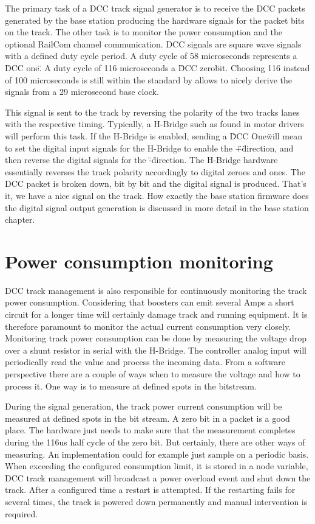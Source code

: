 The primary task of a DCC track signal generator is to receive the DCC packets generated by the base station producing the hardware signals for the packet bits on the track. The other task is to monitor the power consumption and the optional RailCom channel communication. DCC signals are square wave signals with a defined duty cycle period. A duty cycle of 58 microseconds represents a \"DCC one\". A duty cycle of 116 microseconds a \"DCC zero\" bit. Choosing 116 instead of 100 microseconds is still within the standard by allows to nicely derive the signals from a 29 microsecond base clock. 

This signal is sent to the track by reversing the polarity of the two tracks lanes with the respective timing. Typically, a H-Bridge such as found in motor drivers will perform this task. If the H-Bridge is enabled, sending a \"DCC One\" will mean to set the digital input signals for the H-Bridge to enable the \"+\" direction, and then reverse the digital signals for the \"-\" direction. The H-Bridge hardware essentially reverses the track polarity accordingly to digital zeroes and ones. The DCC packet is broken down, bit by bit and the digital signal is produced.  That's it, we have a nice signal on the track. How exactly the base station firmware does the digital signal output generation is discussed in more detail in the base station chapter.

\section{Power consumption monitoring}

DCC track management is also responsible for continuously monitoring the track power consumption. Considering that boosters can emit several Amps a short circuit for a longer time will certainly damage track and running equipment. It is therefore paramount to monitor the actual current consumption very closely. Monitoring track power consumption can be done by measuring the voltage drop over a shunt resistor in serial with the H-Bridge. The controller analog input will periodically read the value and process the incoming data. From a software perspective there are a couple of ways when to measure the voltage and how to process it. One way is to measure at defined spots in the bitstream.

During the signal generation, the track power current consumption will be measured at defined spots in the bit stream. A zero bit in a packet is a good place. The hardware just needs to make sure that the measurement completes during the 116us half cycle of the zero bit. But certainly, there are other ways of measuring. An implementation could for example just sample on a periodic basis. When exceeding the configured consumption limit, it is stored in a node variable, DCC track management will broadcast a power overload event and shut down the track. After a configured time a restart is attempted. If the restarting fails for several times, the track is powered down permanently and manual intervention is required.

